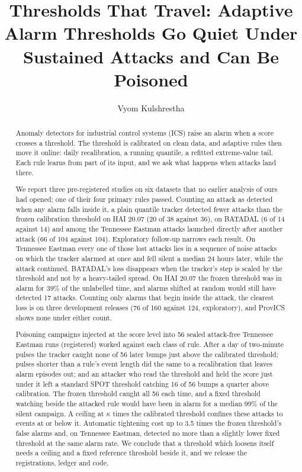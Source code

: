 \documentclass[sigconf]{acmart}
\begin{document}
\title[Thresholds That Travel]{Thresholds That Travel: Adaptive Alarm Thresholds Go Quiet Under
  Sustained Attacks and Can Be Poisoned}

\author{Vyom Kulshrestha}
\renewcommand{\shortauthors}{Kulshrestha}

\begin{abstract}
Anomaly detectors for industrial control systems (ICS) raise an alarm when a score crosses a
threshold. The threshold is calibrated on clean data, and adaptive rules then move it online: daily
recalibration, a running quantile, a refitted extreme-value tail. Each rule learns from part of its
input, and we ask what happens when attacks land there.

We report three pre-registered studies on six datasets that no earlier analysis of ours had opened;
one of their four primary rules passed. Counting an attack as detected when any alarm falls inside it,
a plain quantile tracker detected fewer attacks than the frozen calibration threshold on HAI 20.07 (20
of 38 against 36), on BATADAL (6 of 14 against 14) and among the Tennessee Eastman attacks launched
directly after another attack (66 of 104 against 104). Exploratory follow-up narrows each result. On
Tennessee Eastman every one of those lost attacks lies in a sequence of noise attacks on which the tracker alarmed
at once and fell silent a median 24 hours later, while the attack continued. BATADAL's loss disappears
when the tracker's step is scaled by the threshold and not by a heavy-tailed spread. On HAI 20.07 the
frozen threshold was in alarm for 39\% of the unlabelled time, and alarms shifted at random would still
have detected 17 attacks. Counting only alarms that begin inside the attack, the clearest loss is on
three development releases (76 of 160 against 124, exploratory), and ProvICS shows none under either
count.

Poisoning campaigns injected at the score level into 56 sealed attack-free Tennessee Eastman runs
(registered) worked against each class of rule. After a day of two-minute pulses the tracker caught
none of 56 later bumps just above the calibrated threshold; pulses shorter than a rule's event length
did the same to a recalibration that leaves alarm episodes out; and an attacker who read the threshold
and held the score just under it left a standard SPOT threshold catching 16 of 56 bumps a quarter above
calibration. The frozen threshold caught all 56 each time, and a fixed threshold watching beside the
attacked rule would have been in alarm for a median 99\% of the silent campaign. A ceiling at $\kappa$
times the calibrated threshold confines these attacks to events at or below it. Automatic tightening
cost up to 3.5 times the frozen threshold's false alarms and, on Tennessee Eastman, detected no more
than a slightly lower fixed threshold at the same alarm rate. We conclude that a threshold which
loosens itself needs a ceiling and a fixed reference threshold beside it, and we release the
registrations, ledger and code.
\end{abstract}
\end{document}
